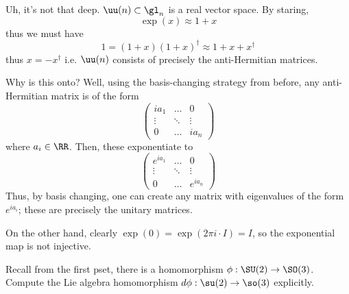 \documentclass[11pt, headheight=30pt]{scrartcl}
\begin{document}

\begin{psec*}
    [Part 3]
\end{psec*}

Uh, it's not that deep. $\uu(n)\subset \gl_n$ is a real vector space.
By staring,
\[
    \exp(x)\approx 1 + x    
\]
thus we must have
\[
    1 = (1 + x)(1 + x)^\dagger \approx 1 + x + x^\dagger    
\]
thus $x= -x^\dagger$ i.e. $\uu(n)$ consists of precisely
the anti-Hermitian matrices.

Why is this onto? Well, using the basis-changing strategy from
before, any anti-Hermitian matrix is of the form
\[
    \begin{pmatrix}
        ia_1 & \dots & 0 \\
        \vdots & \ddots & \vdots \\
        0 & \dots & ia_n
    \end{pmatrix}    
\]
where $a_i\in \RR$. Then, these exponentiate to
\[
    \begin{pmatrix}
        e^{ia_1} & \dots & 0 \\
        \vdots & \ddots & \vdots \\
        0 & \dots & e^{ia_n}
    \end{pmatrix}
\]
Thus, by basis changing, one can create any matrix
with eigenvalues of the form $e^{ia_i}$; these are precisely
the unitary matrices.

On the other hand, clearly $\exp(0) = \exp(2\pi i\cdot I) = I$,
so the exponential map is not injective.

\pagebreak
\begin{prob*}
    Recall from the first pset, there is a homomorphism $\phi:\SU(2)\to\SO(3)$. Compute
    the Lie algebra homomorphism $d\phi:\su(2)\to\so(3)$ explicitly.
\end{prob*}
\end{document}
